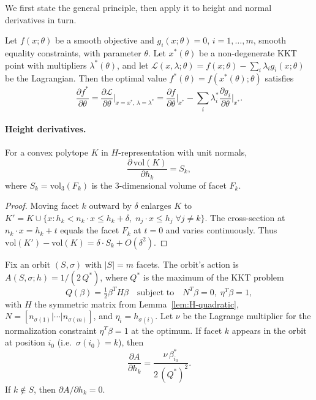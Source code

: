 We first state the general principle, then apply it to height and normal
derivatives in turn.

\begin{theorem*}
Let $f(x;\theta)$ be a smooth objective and $g_i(x;\theta) = 0$,
$i = 1,\dots,m$, smooth equality constraints, with parameter $\theta$.
Let $x^*(\theta)$ be a non-degenerate KKT point with multipliers
$\lambda^*(\theta)$, and let
$\mathcal{L}(x,\lambda;\theta) = f(x;\theta) - \sum_i \lambda_i g_i(x;\theta)$
be the Lagrangian.
Then the optimal value $f^*(\theta) = f(x^*(\theta);\theta)$ satisfies
\[
  \frac{\partial f^*}{\partial \theta}
  = \frac{\partial \mathcal{L}}{\partial \theta}\bigg|_{x=x^*,\,\lambda=\lambda^*}
  = \frac{\partial f}{\partial \theta}\bigg|_{x^*}
    - \sum_i \lambda_i^* \frac{\partial g_i}{\partial \theta}\bigg|_{x^*}.
\]
\end{theorem*}

\paragraph{Height derivatives.}

\begin{lemma}
\label{lem:vol-derivative}
For a convex polytope $K$ in $H$-representation with unit normals,
\[
  \frac{\partial\,\mathrm{vol}(K)}{\partial h_k} = S_k,
\]
where $S_k = \mathrm{vol}_{3}(F_k)$ is the $3$-dimensional volume of facet $F_k$.
\end{lemma}

\begin{proof}
Moving facet $k$ outward by $\delta$ enlarges $K$ to
$K' = K \cup \{x : h_k < n_k \cdot x \le h_k + \delta,\; n_j \cdot x \le h_j \;\forall j \ne k\}$.
The cross-section at $n_k \cdot x = h_k + t$ equals the facet $F_k$ at $t = 0$
and varies continuously.
Thus $\mathrm{vol}(K') - \mathrm{vol}(K) = \delta \cdot S_k + O(\delta^2)$.
\end{proof}

\begin{lemma}
\label{lem:cap-derivative}
Fix an orbit $(S,\sigma)$ with $|S| = m$ facets. The orbit's action is
$A(S,\sigma;h) = 1/(2\,Q^*)$, where $Q^*$ is the maximum of the KKT problem
\[
  Q(\beta) = \tfrac{1}{2}\beta^T H \beta
  \quad\text{subject to}\quad
  N^T\beta = 0,\; \eta^T\beta = 1,
\]
with $H$ the symmetric matrix from Lemma~\ref{lem:H-quadratic},
$N = [n_{\sigma(1)} | \cdots | n_{\sigma(m)}]$, and $\eta_i = h_{\sigma(i)}$.
Let $\nu$ be the Lagrange multiplier for the normalization constraint
$\eta^T\beta = 1$ at the optimum.
If facet $k$ appears in the orbit at position $i_0$ (i.e.\ $\sigma(i_0) = k$), then
\[
  \frac{\partial A}{\partial h_k}
  = \frac{\nu\,\beta_{i_0}^*}{2\,(Q^*)^2}.
\]
If $k \notin S$, then $\partial A / \partial h_k = 0$.
\end{lemma}

